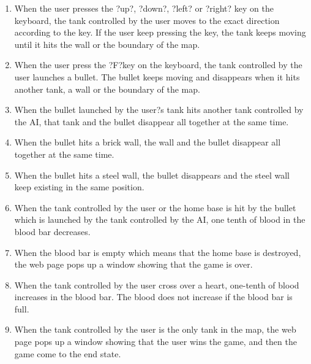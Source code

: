 \documentclass{article}
\begin{document}
\begin{enumerate}
\item When the user presses the ?up?, ?down?, ?left? or ?right? key on the 
keyboard, the tank controlled by the user moves to the exact direction according 
to the key. If the user keep pressing the key, the tank keeps moving until it 
hits the wall or the boundary of the map.
\item When the user press the ?F?key on the keyboard, the tank controlled by the
 user launches a bullet. The bullet keeps moving and disappears when it hits 
 another tank, a wall or the boundary of the map.
\item When the bullet launched by the user?s tank hits another tank controlled 
by the AI, that tank and the bullet disappear all together at the same time.
\item When the bullet hits a brick wall, the wall and the bullet disappear all 
together at the same time.
\item When the bullet hits a steel wall, the bullet disappears and the steel 
wall keep existing in the same position.
\item When the tank controlled by the user or the home base is hit by the 
bullet which is launched by the tank controlled by the AI, one tenth of blood 
in the blood bar decreases.
\item When the blood bar is empty which means that the home base is destroyed, 
the web page pops up a window showing that the game is over.
\item When the tank controlled by the user cross over a heart, one-tenth of 
blood increases in the blood bar. The blood does not increase if the blood bar 
is full.
\item When the tank controlled by the user is the only tank in the map, the web 
page pops up a window showing that the user wins the game, and then the game 
come to the end state.
\end{enumerate}
\end{document}
